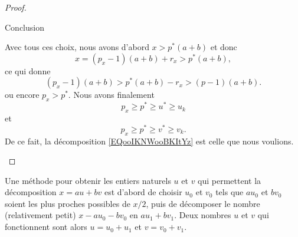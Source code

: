 \begin{proof}
\begin{subproof}
\item[Conclusion]

    Avec tous ces choix, nous avons d'abord \( x>p^*(a+b)\) et donc
    \begin{equation}
        x=(p_x-1)(a+b)+r_x>p^*(a+b),
    \end{equation}
    ce qui donne
    \begin{equation}
        (p_x-1)(a+b)>p^*(a+b)-r_x>(p-1)(a+b).
    \end{equation}
    ou encore \( p_x>p^*\). Nous avons finalement
    \begin{equation}
       p_x \geq p^* \geq u^* \geq u_k
    \end{equation}
    et
    \begin{equation}
       p_x \geq p^* \geq v^* \geq v_k.
    \end{equation}
    De ce fait, la décomposition \eqref{EQooIKNWooBKItYz} est celle que nous voulions.
    \end{subproof}
\end{proof}


%
\begin{remark}
    Une méthode pour obtenir les entiers naturels $u$ et $v$ qui permettent la décomposition \(x = au + bv \) est d'abord de choisir $u_0$ et $v_0$ tels que \( au_0 \) et \( bv_0 \) soient les plus proches possibles de $x/2$, puis de décomposer le nombre (relativement petit) \( x - au_0 - bv_0 \) en \( au_1 + bv_1 \). Deux nombres $u$ et $v$ qui fonctionnent sont alors $u = u_0 + u_1$ et $v = v_0 + v_1$.
\end{remark}

